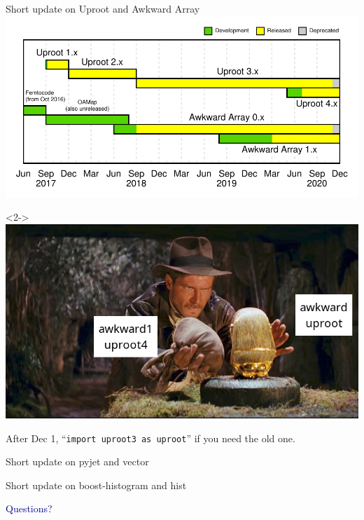 \documentclass[aspectratio=169]{beamer}
\begin{document}
\begin{frame}{Short update on Uproot and Awkward Array}
\includegraphics[width=\linewidth]{uproot-awkward-timeline.pdf}

\begin{uncoverenv}<2->
\vspace{-4.28 cm}
\includegraphics[height=4.28 cm]{Raiders-of-the-Lost-Ark-Chamber.jpg}

\begin{center}
After Dec 1, ``\texttt{import uproot3 as uproot}'' if you need the old one.
\end{center}
\end{uncoverenv}
\end{frame}

\begin{frame}{Short update on pyjet and vector}





\end{frame}

\begin{frame}{Short update on boost-histogram and hist}





\end{frame}

\begin{frame}{}
\Huge
\vspace{1 cm}
\begin{center}
\textcolor{darkblue}{Questions?}
\end{center}
\end{frame}
\end{document}
